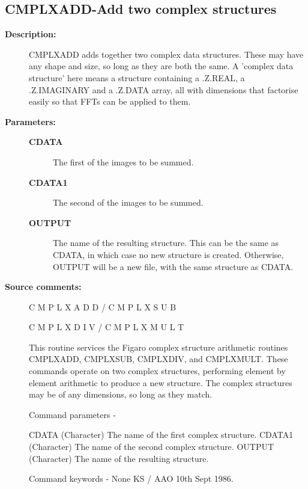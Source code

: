 \subsection{CMPLXADD-\label{CMPLXADD}Add two complex structures}
\begin{description}

\item [\textbf{Description:}]
 CMPLXADD adds together two complex data structures.  These may
 have any shape and size, so long as they are both the same.  A
 'complex data structure' here means a structure containing a
 .Z.REAL, a .Z.IMAGINARY and a .Z.DATA array, all with dimensions
 that factorise easily so that FFTs can be applied to them.

\item [\textbf{Parameters:}]
\begin{description}
\item [\textbf{CDATA}]
 The first of the images to be summed.
\item [\textbf{CDATA1}]
 The second of the images to be summed.
\item [\textbf{OUTPUT}]
 The name of the resulting structure. This can
 be the same as CDATA, in which case no new structure is
 created.  Otherwise, OUTPUT will be a new file, with the
 same structure as CDATA.
\end{description}

\item [\textbf{Source comments:}]
\begin{terminalv}
 C M P L X A D D   /   C M P L X S U B

 C M P L X D I V   /   C M P L X M U L T

 This routine services the Figaro complex structure arithmetic
 routines CMPLXADD, CMPLXSUB, CMPLXDIV, and CMPLXMULT.  These
 commands operate on two complex structures, performing element
 by element arithmetic to produce a new structure.  The complex
 structures may be of any dimensions, so long as they match.

 Command parameters -

 CDATA    (Character) The name of the first complex structure.
 CDATA1   (Character) The name of the second complex structure.
 OUTPUT   (Character) The name of the resulting structure.

 Command keywords - None
                                     KS / AAO  10th Sept 1986.
\end{terminalv}
\end{description}
